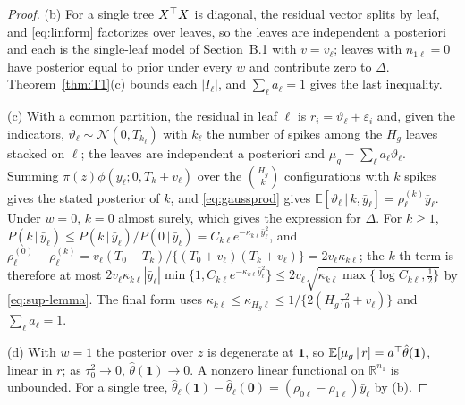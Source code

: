 \documentclass[11pt]{article}
\newcommand{\E}{\mathbb{E}}
\newcommand{\Normal}{\mathcal{N}}
\newcommand{\given}{\,\vert\,}
\theoremstyle{definition}
\theoremstyle{plain}
\begin{document}
{\begin{proof}
(b) For a single tree $X^{\top} X$ is diagonal, the residual vector splits by leaf, and \eqref{eq:linform} factorizes over leaves, so the leaves are independent a posteriori and each is the single-leaf model of Section~B.1 with $v=v_\ell$; leaves with $n_{1\ell}=0$ have posterior equal to prior under every $w$ and contribute zero to $\Delta$. Theorem~\ref{thm:T1}(c) bounds each $|I_\ell|$, and $\sum_\ell a_\ell=1$ gives the last inequality.

(c) With a common partition, the residual in leaf $\ell$ is $r_i=\vartheta_\ell+\varepsilon_i$ and, given the indicators, $\vartheta_\ell\sim\Normal(0,T_{k_\ell})$ with $k_\ell$ the number of spikes among the $H_g$ leaves stacked on $\ell$; the leaves are independent a posteriori and $\mu_g=\sum_\ell a_\ell\vartheta_\ell$. Summing $\pi(z)\phi(\bar y_\ell;0,T_k+v_\ell)$ over the $\binom{H_g}{k}$ configurations with $k$ spikes gives the stated posterior of $k$, and \eqref{eq:gaussprod} gives $\E[\vartheta_\ell\given k,\bar y_\ell]=\rho^{(k)}_\ell\bar y_\ell$. Under $w=0$, $k=0$ almost surely, which gives the expression for $\Delta$. For $k\ge1$, $P(k\given\bar y_\ell)\le P(k\given\bar y_\ell)/P(0\given\bar y_\ell)=C_{k\ell}e^{-\kappa_{k\ell}\bar y_\ell^2}$, and $\rho^{(0)}_\ell-\rho^{(k)}_\ell=v_\ell(T_0-T_k)/\{(T_0+v_\ell)(T_k+v_\ell)\}=2v_\ell\kappa_{k\ell}$; the $k$-th term is therefore at most $2v_\ell\kappa_{k\ell}|\bar y_\ell|\min\{1,C_{k\ell}e^{-\kappa_{k\ell}\bar y_\ell^2}\}\le2v_\ell\sqrt{\kappa_{k\ell}\max\{\log C_{k\ell},\tfrac12\}}$ by \eqref{eq:sup-lemma}. The final form uses $\kappa_{k\ell}\le\kappa_{H_g\ell}\le1/\{2(H_g\tau_0^2+v_\ell)\}$ and $\sum_\ell a_\ell=1$.

(d) With $w=1$ the posterior over $z$ is degenerate at $\mathbf 1$, so $\E[\mu_g\given r]=a\tr\hat\theta(\mathbf 1)$, linear in $r$; as $\tau_0^2\to0$, $\hat\theta(\mathbf 1)\to0$. A nonzero linear functional on $\mathbb R^{n_1}$ is unbounded. For a single tree, $\hat\theta_\ell(\mathbf 1)-\hat\theta_\ell(\mathbf 0)=(\rho_{0\ell}-\rho_{1\ell})\bar y_\ell$ by (b).
\end{proof}

}
\end{document}
